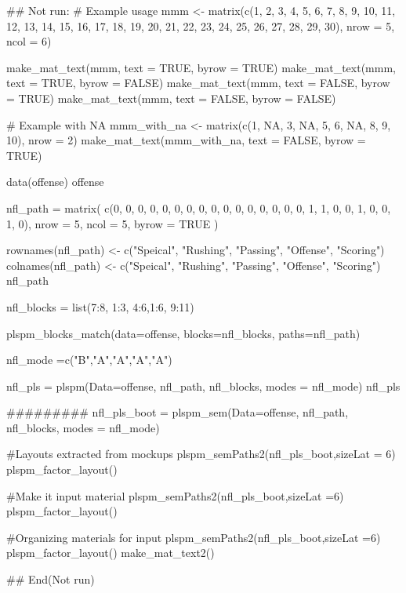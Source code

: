 \documentclass[a4paper]{book}
\begin{document}
\begin{Examples}
\begin{ExampleCode}

\#\# Not run: 
# Example usage
mmm <- matrix(c(1, 2, 3, 4, 5, 6, 7, 8, 9,
10, 11, 12, 13, 14, 15, 16, 17, 18, 19, 20,
21, 22, 23, 24, 25, 26, 27, 28, 29, 30),
 nrow = 5, ncol = 6)

make_mat_text(mmm, text = TRUE, byrow = TRUE)
make_mat_text(mmm, text = TRUE, byrow = FALSE)
make_mat_text(mmm, text = FALSE, byrow = TRUE)
make_mat_text(mmm, text = FALSE, byrow = FALSE)

# Example with NA
mmm_with_na <- matrix(c(1, NA, 3, NA, 5, 6, NA, 8, 9, 10), nrow = 2)
make_mat_text(mmm_with_na, text = FALSE, byrow = TRUE)

data(offense)
offense %

nfl_path = matrix(
  c(0, 0, 0, 0, 0,
    0, 0, 0, 0, 0,
    0, 0, 0, 0, 0,
    0, 1, 1, 0, 0,
    1, 0, 0, 1, 0),
  nrow = 5, ncol = 5, byrow = TRUE )

rownames(nfl_path) <- c("Speical", "Rushing",
"Passing", "Offense", "Scoring")
colnames(nfl_path) <- c("Speical", "Rushing",
"Passing", "Offense", "Scoring")
nfl_path

nfl_blocks = list(7:8, 1:3, 4:6,1:6, 9:11)

plspm_blocks_match(data=offense, blocks=nfl_blocks,
                   paths=nfl_path)

nfl_mode =c("B","A","A","A","A")

nfl_pls = plspm(Data=offense, nfl_path, nfl_blocks, modes = nfl_mode)
nfl_pls%

#########
nfl_pls_boot = plspm_sem(Data=offense, nfl_path,
 nfl_blocks, modes = nfl_mode)

#Layouts extracted from mockups
plspm_semPaths2(nfl_pls_boot,sizeLat = 6)%
  plspm_factor_layout()

#Make it input material
plspm_semPaths2(nfl_pls_boot,sizeLat =6)%
  plspm_factor_layout() %

#Organizing materials for input
plspm_semPaths2(nfl_pls_boot,sizeLat =6)%
  plspm_factor_layout() %
  make_mat_text2()

## End(Not run)

\end{ExampleCode}
\end{Examples}
\end{document}
